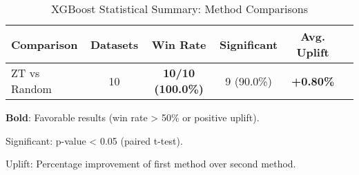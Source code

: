 \begin{table}[htbp]
\centering
\caption{XGBoost Statistical Summary: Method Comparisons}
\label{tab:xgboost_stats_summary}
\begin{tabular}{lccccc}
\toprule
Comparison & Datasets & Win Rate & Significant & Avg. Uplift \\
\midrule
ZT vs Random & 10 & \textbf{10/10 (100.0\%)} & 9 (90.0\%) & \textbf{+0.80\%} \\
\bottomrule
\end{tabular}
\begin{tablenotes}
\small
\item \textbf{Bold}: Favorable results (win rate > 50\% or positive uplift).
\item Significant: p-value < 0.05 (paired t-test).
\item Uplift: Percentage improvement of first method over second method.
\end{tablenotes}
\end{table}
